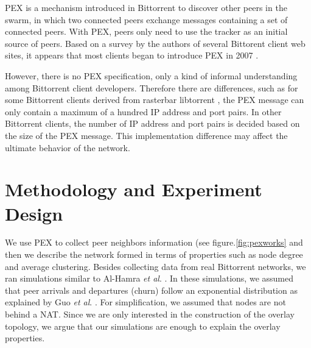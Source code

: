 \documentclass[10pt,conference,letterpaper]{IEEEtran}
\begin{document}
PEX is a mechanism introduced in Bittorrent to discover other peers in the swarm, in which two connected peers exchange messages containing a set of connected peers.  
With PEX, peers only need to use the tracker as an initial source of peers.   
Based on a survey by the authors of several Bittorent client web sites, it appears that most clients began to introduce PEX in 2007 \cite{client}.

However,  there is no PEX specification, only a kind of informal understanding among Bittorrent client developers.
Therefore there are differences, such as for some Bittorrent clients derived from rasterbar libtorrent \cite{rasterbar}, the PEX message can only contain a maximum of a hundred IP address and port pairs. 
In other Bittorrent clients, the number of IP address and port pairs is decided based on the size of the PEX message.  
This implementation difference may affect the ultimate behavior of the network.

\section{Methodology and Experiment Design}\label{methodanddesign}

We use PEX to collect peer neighbors information  (see figure.\ref{fig:pexworks} and then we describe the network formed in terms of properties such as node degree and average clustering. 
Besides collecting data from real Bittorrent networks, we ran simulations similar to Al-Hamra \textit{et al}. \cite{al2009swarming}. 
In these simulations, we assumed that peer arrivals and departures (churn) follow an exponential distribution as explained by Guo \textit{et al}. \cite{guo2005measurements}. 
For simplification, we assumed that nodes are not behind a NAT.
Since we are only interested in the construction of the overlay topology, we argue that our simulations are enough to explain the overlay properties.
\end{document}
